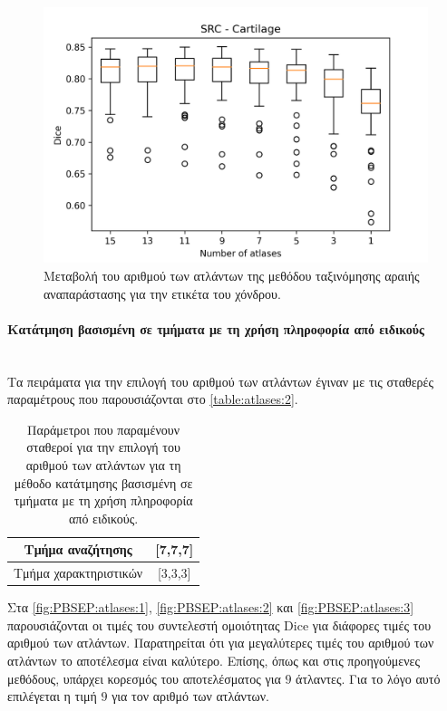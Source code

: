 \documentclass[a4paper,12pt]{article}
\newcommand{\paragraphLine}[1]{\paragraph{#1}\mbox{}\\}
\begin{document}
\begin{figure}[H]
    \centering
    \includegraphics[width=0.85\linewidth]{SRC_Number_of_atlases_Cartilage_plot.png}
    \caption{Μεταβολή του αριθμού των ατλάντων της μεθόδου ταξινόμησης αραιής
             αναπαράστασης για την ετικέτα του χόνδρου.}
    \label{fig:SRC:atlases:3}
\end{figure}

\paragraphLine{Κατάτμηση βασισμένη σε τμήματα με τη χρήση πληροφορία από
               ειδικούς}

Τα πειράματα για την επιλογή του αριθμού των ατλάντων έγιναν με τις σταθερές
παραμέτρους που παρουσιάζονται στο \autoref{table:atlases:2}.

\begin{table}[h!]
    \centering
    \begin{tabular}{|c|c|} 
        \hline
        Τμήμα αναζήτησης & [7,7,7] \\ 
        \hline
        Τμήμα χαρακτηριστικών & [3,3,3] \\ 
        \hline
    \end{tabular}
    \caption{Παράμετροι που παραμένουν σταθεροί για την επιλογή του αριθμού των
             ατλάντων για τη μέθοδο κατάτμησης βασισμένη σε τμήματα με τη χρήση
             πληροφορία από ειδικούς.}
    \label{table:atlases:2}
\end{table}

Στα \autoref{fig:PBSEP:atlases:1}, \autoref{fig:PBSEP:atlases:2} και
\autoref{fig:PBSEP:atlases:3} παρουσιάζονται οι τιμές του συντελεστή ομοιότητας
Dice για διάφορες τιμές του αριθμού των ατλάντων. Παρατηρείται ότι για
μεγαλύτερες τιμές του αριθμού των ατλάντων το αποτέλεσμα είναι καλύτερο. Επίσης,
όπως και στις προηγούμενες μεθόδους, υπάρχει κορεσμός του αποτελέσματος για $9$
άτλαντες. Για το λόγο αυτό επιλέγεται η τιμή $9$ για τον αριθμό των ατλάντων.
\end{document}
